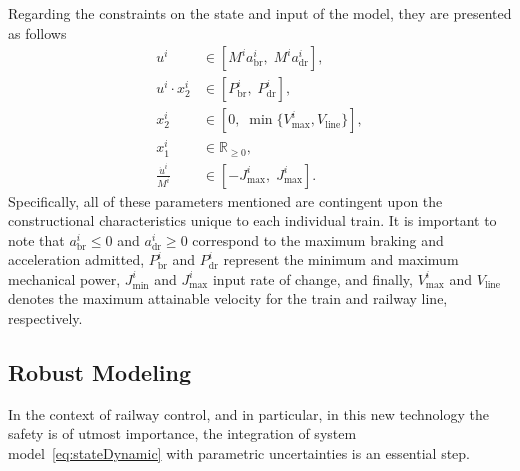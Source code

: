 Regarding the constraints on the state and input of the model, they are presented as follows
%
\begin{subequations} \label{eq:modelConstraints}
	\begin{align}
		u^i &\in \left[M^i a_{\mathrm{br}}^i, \;M^i a_{\mathrm{dr}}^i \right], \label{eq:lim1} \\
		u^i \cdot x_2^i&\in \left[P^i_{\mathrm{br}}, \;P^i_{\mathrm{dr}}\right], \label{eq:lim2} \\
		x_2^i &\in \left[0, \;\min\{V^i_{\mathrm{max}},V_{\mathrm{line}}\}\right], \label{eq:lim5} \\
		x_1^i &\in \mathbb{R}_{\geq0}, \label{eq:lim4}  \\ 
		\frac{\dot{u}^i }{M^i}&\in \left[-J^i_{\mathrm{max}}, \;J^i_{\mathrm{max}}\right]. \label{eq:lim3}
	\end{align}
\end{subequations}
%
Specifically, all of these parameters mentioned are contingent upon the constructional characteristics unique to each individual train. It is important to note that $a_{\mathrm{br}}^i \leq 0$ and $a_{\mathrm{dr}}^i \geq 0$ correspond to the maximum braking and acceleration admitted, $P^i_{\mathrm{br}}$ and $P^i_{\mathrm{dr}}$ represent the minimum and maximum mechanical power, $J^i_{\min}$ and $J^i_{\max}$  input rate of change, and finally, $V^i_{\max}$ and $V_{\mathrm{line}}$ denotes the maximum attainable velocity for the train and railway line, respectively.

\subsection{Robust Modeling}
\label{subsec:robustModeling}
%
In the context of railway control, and in particular, in this new technology the safety is of utmost importance, the integration of system model~\eqref{eq:stateDynamic} with parametric uncertainties is an essential step. 

